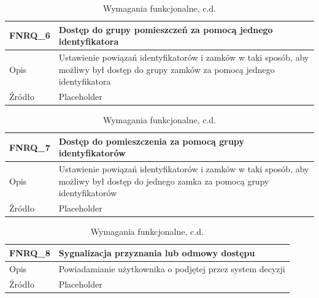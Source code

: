         \begin{table}
        \ContinuedFloat
        \caption{Wymagania funkcjonalne, c.d.}
            \begin{subtable}[c]{\textwidth}
                \centering
                 \begin{tabular}{|p{2cm}|p{10cm}|}
                    \hline FNRQ\_6      & Dostęp do grupy pomieszczeń za pomocą jednego identyfikatora  \\
                    \hline Opis         & Ustawienie powiązań identyfikatorów i zamków w taki sposób, aby możliwy był dostęp do grupy zamków za pomocą jednego identyfikatora \\
                    \hline Źródło       & Placeholder    \\
                    \hline
                \end{tabular}
                \label{tbl:fnrq6}
                \vspace{10mm}           
            \end{subtable}
        \quad%
            \begin{subtable}[c]{\textwidth}
                \centering
                 \begin{tabular}{|p{2cm}|p{10cm}|}
                    \hline FNRQ\_7      & Dostęp do pomieszczenia za pomocą grupy identyfikatorów  \\
                    \hline Opis         & Ustawienie powiązań identyfikatorów i zamków w taki sposób, aby możliwy był dostęp do jednego zamka za pomocą grupy identyfikatorów \\
                    \hline Źródło       & Placeholder    \\
                    \hline
                \end{tabular}
                \label{tbl:fnrq7}
                \vspace{10mm}           
            \end{subtable}
        \quad%
            \begin{subtable}[c]{\textwidth}
                \centering
                 \begin{tabular}{|p{2cm}|p{10cm}|}
                    \hline FNRQ\_8      & Sygnalizacja przyznania lub odmowy dostępu  \\
                    \hline Opis         & Powiadamianie użytkownika o podjętej przez system decyzji \\
                    \hline Źródło       & Placeholder    \\

\end{tabular}
\end{subtable}
\end{table}
